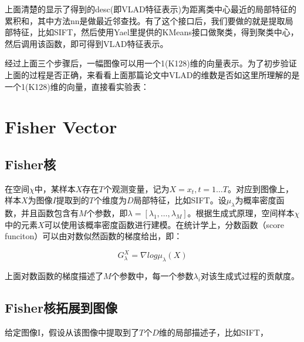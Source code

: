 \documentclass[color=cyan,mathpazo,titlestyle=hang]{elegantbook}
\begin{document}
上面清楚的显示了得到的desc(即VLAD特征表示)为距离类中心最近的局部特征的累积和，其中方法nn是做最近邻查找。有了这个接口后，我们要做的就是提取局部特征，比如SIFT，然后使用Yael里提供的KMeans接口做聚类，得到聚类中心，然后调用该函数，即可得到VLAD特征表示。

经过上面三个步骤后，一幅图像可以用一个1(K128)维的向量表示。为了初步验证上面的过程是否正确，来看看上面那篇论文中VLAD的维数是否如这里所理解的是一个1(K128)维的向量，直接看实验表：

\section{Fisher Vector}

\subsection{Fisher核}

在空间$\chi$中，某样本$X$存在$T$个观测变量，记为$X={x_t, t=1 \dots T}$。对应到图像上，样本$X$为图像$I$提取到的$T$个维度为$D$局部特征，比如SIFT。设$\mu_\lambda$为概率密度函数，并且函数包含有$M$个参数，即$\lambda = [\lambda_1, \dots, \lambda_M]$。根据生成式原理，空间样本$\chi$中的元素$X$可以使用该概率密度函数进行建模。在统计学上，分数函数（score funciton）可以由对数似然函数的梯度给出，即：

$$G^X_\lambda = \nabla log \mu_\lambda(X)$$ 

上面对数函数的梯度描述了$M$个参数中，每一个参数$\lambda_i$对该生成式过程的贡献度。

\subsection{Fisher核拓展到图像}

给定图像I，假设从该图像中提取到了$T$个$D$维的局部描述子，比如SIFT，
\end{document}
